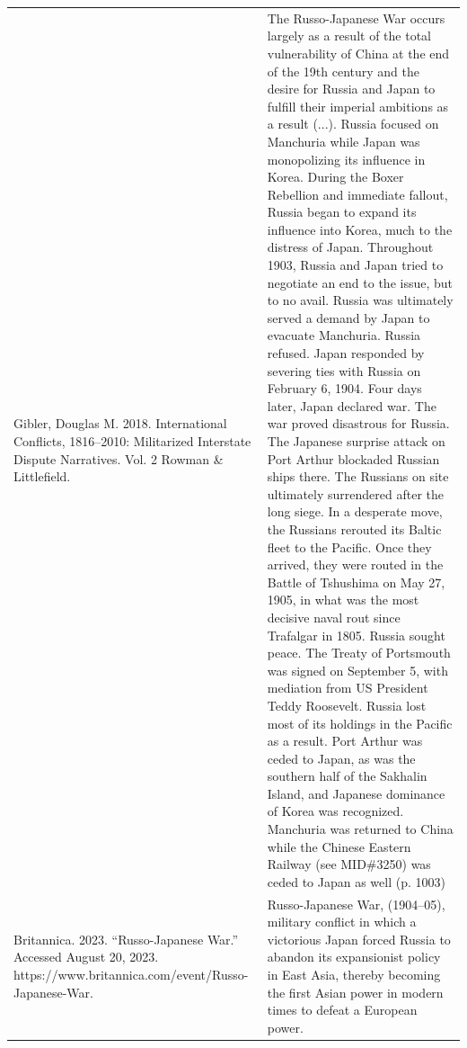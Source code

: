 {\begin{longtable}{p{}p{}}
Gibler, Douglas M. 2018. International Conflicts, 1816–2010: Militarized Interstate Dispute Narratives. Vol. 2 Rowman \& Littlefield. & The Russo-Japanese War occurs largely as a result of the total vulnerability of China at the end of the 19th century and the desire for Russia and Japan to fulfill their imperial ambitions as a result (...). Russia focused on Manchuria while Japan was monopolizing its influence in Korea. During the Boxer Rebellion and immediate fallout, Russia began to expand its influence into Korea, much to the distress of Japan. Throughout 1903, Russia and Japan tried to negotiate an end to the issue, but to no avail. Russia was ultimately served a demand by Japan to evacuate Manchuria. Russia refused. Japan responded by severing ties with Russia on February 6, 1904. Four days later, Japan declared war. The war proved disastrous for Russia. The Japanese surprise attack on Port Arthur blockaded Russian ships there. The Russians on site ultimately surrendered after the long siege. In a desperate move, the Russians rerouted its Baltic fleet to the Pacific. Once they arrived, they were routed in the Battle of Tshushima on May 27, 1905, in what was the most decisive naval rout since Trafalgar in 1805. Russia sought peace. The Treaty of Portsmouth was signed on September 5, with mediation from US President Teddy Roosevelt. Russia lost most of its holdings in the Pacific as a result. Port Arthur was ceded to Japan, as was the southern half of the Sakhalin Island, and Japanese dominance of Korea was recognized. Manchuria was returned to China while the Chinese Eastern Railway (see MID\#3250) was ceded to Japan as well (p. 1003)
\\
Britannica. 2023. “Russo-Japanese War.” Accessed August 20, 2023. https://www.britannica.com/event/Russo-Japanese-War. & Russo-Japanese War, (1904–05), military conflict in which a victorious Japan forced Russia to abandon its expansionist policy in East Asia, thereby becoming the first Asian power in modern times to defeat a European power.
\\

\end{longtable}}
